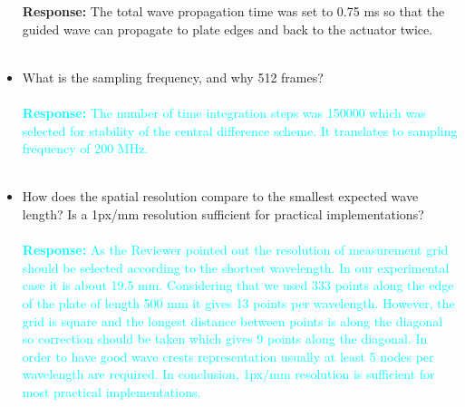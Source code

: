 \documentclass[11pt,a2paper]{report}
\begin{document}
\begin{itemize}
{			\textbf{Response:}
		The total wave propagation time was set to 0.75 ms so that the guided wave can propagate to plate edges and back to the actuator twice.
	    }
		\\ \\
		\item What is the sampling frequency, and why 512 frames?
			\\ \\
		\textcolor{Cyan}{
			\textbf{Response:}
		The number of time integration steps was 150000 which was selected for stability of the central difference scheme. It translates to sampling frequency of 200 MHz.}
		\\ \\
		\item How does the spatial resolution compare to the smallest expected wave length? Is a 1px/mm resolution sufficient for practical implementations?
			\\ \\
		\textcolor{Cyan}{
			\textbf{Response:}
			As the Reviewer pointed out the resolution of measurement grid should be selected according to the shortest wavelength. In our experimental case it is about 19.5 mm. Considering that we used 333 points along the edge of the plate of length 500 mm it gives 13 points per wavelength. However, the grid is square and the longest distance between points is along the diagonal so correction should be taken which gives 9 points along the diagonal. In order to have good wave crests representation usually at least 5 nodes per wavelength are required.
			In conclusion, 1px/mm resolution is sufficient for most practical implementations.
		}
		\\ \\
	\end{itemize}
\end{document}
